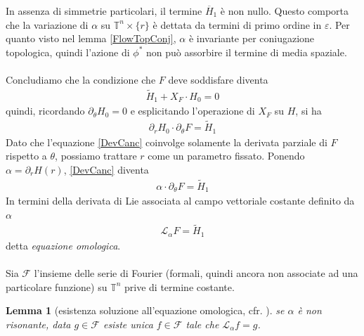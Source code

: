 \documentclass[twoside, 11pt]{amsbook}
\newcommand{\0}{{(0)}}
\newcommand{\3}{{(3)}}
\theoremstyle{colonplain}
\newtheorem{lemma}[thm]{Lemma}
\theoremstyle{colondefinition}
\theoremstyle{colonremark}
\numberwithin{equation}{chapter}
\begin{document}
In assenza di simmetrie particolari, il termine $\overline{H}_1$ è non nullo. Questo comporta che la variazione di $\alpha$ su $\mathbb{T}^n \times \{r\}$ è dettata da termini di primo ordine in $\varepsilon$. Per quanto visto nel lemma \ref{FlowTopConj}, $\alpha$ è invariante per coniugazione topologica, quindi l'azione di $\phi^*$ non può assorbire il termine di media spaziale. \\ \\
Concludiamo che la condizione che $F$ deve soddisfare diventa
\begin{align}\label{DevCanc}
    \tilde{H}_1 + X_F \cdot H_0 = 0 
\end{align}
quindi, ricordando $\partial_\theta H_0 = 0$ e esplicitando l'operazione di $X_F$ su $H$, si ha
\begin{align}
    \partial_rH_0 \cdot \partial_\theta F = \tilde{H}_1 
\end{align}
Dato che l'equazione \eqref{DevCanc} coinvolge solamente la derivata parziale di $F$ rispetto a $\theta$, possiamo trattare $r$ come un parametro fissato. Ponendo $\alpha = \partial_rH(r)$, \eqref{DevCanc} diventa
\begin{align}
    \alpha \cdot \partial_\theta F = \tilde{H}_1 
\end{align}
In termini della derivata di Lie associata al campo vettoriale costante definito da $\alpha$
\begin{align}\label{HomolEq}
    \mathcal{L}_\alpha F = \tilde{H}_1
\end{align}
detta \textit{equazione omologica}. \\ \\
Sia $\mathscr{F}$ l'insieme delle serie di Fourier (formali, quindi ancora non associate ad una particolare funzione) su $\mathbb{T}^n$ prive di termine costante.
\begin{lemma}[esistenza soluzione all'equazione omologica, cfr. \cite{Fejoz01}] se $\alpha$ è non risonante, data $g \in \mathscr{F}$ esiste unica $f \in \mathscr{F}$ tale che $\mathcal{L}_\alpha f = g$.
\end{lemma}
\end{document}
